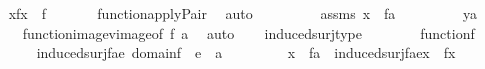 \begin{isabellebody}
\ \ \isamarkupfalse%
\ {\isachardoublequoteopen}{\isasymlangle}x{\isacharcomma}{\kern0pt}f{\isacharbackquote}{\kern0pt}x{\isasymrangle}\ {\isasymin}\ f{\isachardoublequoteclose}\ \isanewline
\ \ \ \ \isamarkupfalse%
\ function{\isacharunderscore}{\kern0pt}apply{\isacharunderscore}{\kern0pt}Pair\ \isamarkupfalse%
\ auto\ \isanewline
\ \ \isamarkupfalse%
\ \isanewline
\ \ \isamarkupfalse%
\ assms\ {\isacartoucheopen}x\ {\isasymin}\ f{\isacharminus}{\kern0pt}{\isacharbackquote}{\kern0pt}{\isacharbackquote}{\kern0pt}a{\isacartoucheclose}\ \isanewline
\ \ \isamarkupfalse%
\ \isanewline
\ \ \isamarkupfalse%
\ {\isachardoublequoteopen}y{\isasymin}a{\isachardoublequoteclose}\isanewline
\ \ \ \ \isamarkupfalse%
\ function{\isacharunderscore}{\kern0pt}image{\isacharunderscore}{\kern0pt}vimage{\isacharbrackleft}{\kern0pt}of\ f\ a{\isacharbrackright}{\kern0pt}\ \isamarkupfalse%
\ auto\isanewline
{}\isamarkupfalse%
%
\endisatagproof
{\isafoldproof}%
%
\isadelimproof
\isanewline
%
\endisadelimproof
\ \ \isanewline
{}\isamarkupfalse%
\ induced{\isacharunderscore}{\kern0pt}surj{\isacharunderscore}{\kern0pt}type{\isacharcolon}{\kern0pt}\ \isanewline
\ \ \isanewline
\ \ \ \ {\isachardoublequoteopen}function{\isacharparenleft}{\kern0pt}f{\isacharparenright}{\kern0pt}{\isachardoublequoteclose}\ \isanewline
\ \ \ \isanewline
\ \ \ \ {\isachardoublequoteopen}induced{\isacharunderscore}{\kern0pt}surj{\isacharparenleft}{\kern0pt}f{\isacharcomma}{\kern0pt}a{\isacharcomma}{\kern0pt}e{\isacharparenright}{\kern0pt}{\isacharcolon}{\kern0pt}\ domain{\isacharparenleft}{\kern0pt}f{\isacharparenright}{\kern0pt}\ {\isasymrightarrow}\ {\isacharbraceleft}{\kern0pt}e{\isacharbraceright}{\kern0pt}\ {\isasymunion}\ a{\isachardoublequoteclose}\isanewline
\ \ \ \ \isanewline
\ \ \ \ {\isachardoublequoteopen}x\ {\isasymin}\ f{\isacharminus}{\kern0pt}{\isacharbackquote}{\kern0pt}{\isacharbackquote}{\kern0pt}a\ {\isasymLongrightarrow}\ induced{\isacharunderscore}{\kern0pt}surj{\isacharparenleft}{\kern0pt}f{\isacharcomma}{\kern0pt}a{\isacharcomma}{\kern0pt}e{\isacharparenright}{\kern0pt}{\isacharbackquote}{\kern0pt}x\ {\isacharequal}{\kern0pt}\ f{\isacharbackquote}{\kern0pt}x{\isachardoublequoteclose}\ \isanewline
%
\isadelimproof
%
\endisadelimproof
%
\isatagproof
{}\isamarkupfalse%
\ {\isacharminus}{\kern0pt}\isanewline
\ \ \isamarkupfalse%

\end{isabellebody}
